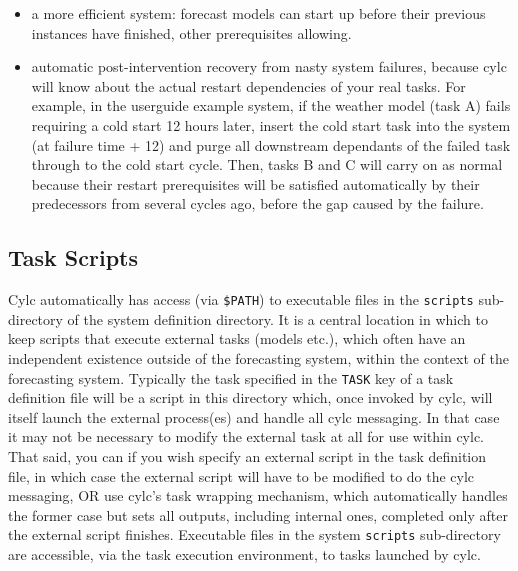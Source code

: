 \documentclass[11pt,a4paper]{article}
\begin{document}
\begin{itemize}

    \item a more efficient system: forecast models can start up before
        their previous instances have finished, other prerequisites
        allowing.  
    
    \item automatic post-intervention recovery from nasty system
        failures, because cylc will know about the actual restart
        dependencies of your real tasks. For example, in the userguide
        example system, if the weather model (task A) fails requiring a
        cold start 12 hours later, insert the cold start task into the
        system (at failure time + 12) and purge all downstream dependants of 
        the failed task through to the cold start cycle. Then, tasks
        B and C will carry on as normal because their restart
        prerequisites will be satisfied automatically by their
        predecessors from several cycles ago, before the gap caused by
        the failure.

\end{itemize}

\subsection{Task Scripts}
\label{TaskScripts}

Cylc automatically has access (via \lstinline=$PATH=) to executable
files in the \lstinline=scripts= sub-directory of the system definition
directory. It is a central location in which to keep scripts that
execute external tasks (models etc.), which often have an independent
existence outside of the forecasting system, within the context of the
forecasting system.
Typically the task specified in the \lstinline=TASK=
key of a task definition file will be a script in this directory which,
once invoked by cylc, will itself launch the external process(es) and
handle all cylc messaging. In that case it may not be necessary to
modify the external task at all for use within cylc. That said, you can
if you wish specify an external script in the task definition file, in
which case the external script will have to be modified to do the cylc
messaging, OR use cylc's task wrapping mechanism, which automatically
handles the former case but sets all outputs, including internal ones,
completed only after the external script finishes. Executable files in
the system \lstinline=scripts= sub-directory are accessible, via 
the task execution environment, to tasks launched by cylc. 
\end{document}
